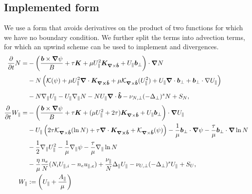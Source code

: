 \subsection{Implemented form}
We use a form that avoids derivatives on the product of two
functions for which we have no boundary condition.
We further split the terms into advection terms, for which an upwind scheme can be
used to implement and divergences.
\begin{subequations}
    \begin{align}
    \frac{\partial}{\partial t} N =&
        -\left( \frac{\vec b\times\vn \psi}{B}
        + \tau \vec K + \mu U_\parallel^2 \vec K_{\vn\times\bhat} +
        U_\parallel {\vec b}_\perp
    \right)\cn N
\nonumber \\ &
    \vphantom{\frac{\vec b\times\vn \psi}{B}} %
        - N \left( \mathcal K(\psi)
           +\mu U_\parallel^2\nc \vec{ K_{\vn\times\bhat}}
        +\mu \mathcal K_{\vn\times\bhat}(U_\parallel^2)
        + U_\parallel \nc { \vec b}_\perp
    + {\vec b}_\perp\cdot\nabla U_\parallel \right)
\nonumber \\&
    \vphantom{\frac{\vec b\times\vn \psi}{B}} %
    - N\npar U_\parallel - U_\parallel \npar N - NU_\parallel \nc \bhat
    - \nu_{N,\perp}(-\Delta_\perp)^s N + S_N
    , \label{eq:EgyrofluidN}\\
    \frac{\partial}{\partial t} W_\parallel =&
      -\left( \frac{\vec b\times\vn \psi}{B}
          + \tau \vec K + (\mu U_\parallel^2 + 2\tau) \vec K_{\vn\times\bhat} +
        U_\parallel {\vec b}_\perp
    \right)\cn U_\parallel
\nonumber \\&
    \vphantom{\frac{\vec b\times\vn \psi}{B}} %
    - U_\parallel \left( 2\tau \mathcal K_{\vn\times\bhat}(\ln N)
        +\tau \nc\vec{ K_{\vn\times\bhat}}
        + \mathcal K_{\vn\times\bhat}(\psi)
        \right)
        - \frac{1}{\mu} {\vec b}_\perp\cn \psi%
        -\frac{\tau}{\mu} {\vec b}_\perp\cn \ln N
\nonumber \\&
    \vphantom{\frac{\vec b\times\vn \psi}{B}} %
        - \frac{1}{2}\npar U_\parallel^2
        - \frac{1}{\mu} \npar \psi%
        -\frac{\tau}{\mu} \npar \ln N
\nonumber \\&
\vphantom{\frac{\vec b\times\vn \psi}{B}} %
        - \frac{\eta}{\mu} \frac{n_e}{N}(N_iU_{\parallel,i} - n_eu_{\parallel,e})
        + \frac{\nu_\parallel}{N} \Delta_\parallel U_\parallel - \nu_{U,\perp}(-\Delta_\perp)^s U_\parallel
    + S_U
    ,
        \label{eq:EgyrofluidU} \\
        W_\parallel&:= \left( U_\parallel + \frac{A_\parallel}{\mu}\right)
    \end{align}
    \label{eq:Egyrofluid}
\end{subequations}
